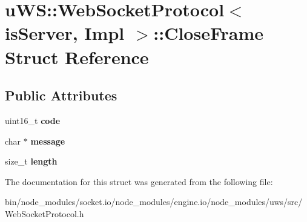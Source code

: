 \hypertarget{structu_w_s_1_1_web_socket_protocol_1_1_close_frame}{}\section{u\+WS\+:\+:Web\+Socket\+Protocol$<$ is\+Server, Impl $>$\+:\+:Close\+Frame Struct Reference}
\label{structu_w_s_1_1_web_socket_protocol_1_1_close_frame}
\subsection*{Public Attributes}
\begin{DoxyCompactItemize}
\item 
\mbox{\label{structu_w_s_1_1_web_socket_protocol_1_1_close_frame_a624c096e54d87125b86e0928d133beea}} 
uint16\+\_\+t {\bfseries code}
\item 
\mbox{\label{structu_w_s_1_1_web_socket_protocol_1_1_close_frame_aca5fcd2b1b972c92b26c0cf01a05a10a}} 
char $\ast$ {\bfseries message}
\item 
\mbox{\label{structu_w_s_1_1_web_socket_protocol_1_1_close_frame_ad39de7849d6c6983c762a50f369fc664}} 
size\+\_\+t {\bfseries length}
\end{DoxyCompactItemize}


The documentation for this struct was generated from the following file\+:\begin{DoxyCompactItemize}
\item 
bin/node\+\_\+modules/socket.\+io/node\+\_\+modules/engine.\+io/node\+\_\+modules/uws/src/Web\+Socket\+Protocol.\+h\end{DoxyCompactItemize}
